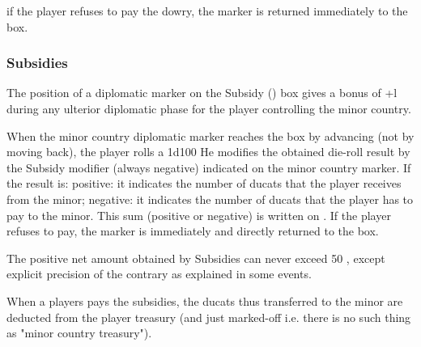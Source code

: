\aparag if the player refuses to pay the dowry, the marker is returned
immediately to the \Neutral box.


\subsubsection{Subsidies}
\aparag The position of a diplomatic marker on the Subsidy (\SUB) box gives a
bonus of +l during any ulterior diplomatic phase for the player controlling
the minor country.

When the minor country diplomatic marker reaches the \SUB box by advancing
(not by moving back), the player rolls a 1d100 He modifies the obtained
die-roll result by the Subsidy modifier (always negative) indicated on the
minor country marker.  If the result is:
\bparag positive: it indicates the number of ducats that the player receives
from the minor;
\bparag negative: it indicates the number of ducats that the player has to pay
to the minor.
\aparag This sum (positive or negative) is written on .
\aparag If the player refuses to pay, the marker is immediately and directly
returned to the \Neutral box.

\aparag The positive net amount obtained by Subsidies can never exceed 50
\ducats, except explicit precision of the contrary as explained in some
events.

\aparag When a players pays the subsidies, the ducats thus transferred to the
minor are deducted from the player treasury (and just marked-off i.e. there is
no such thing as "minor country treasury").



